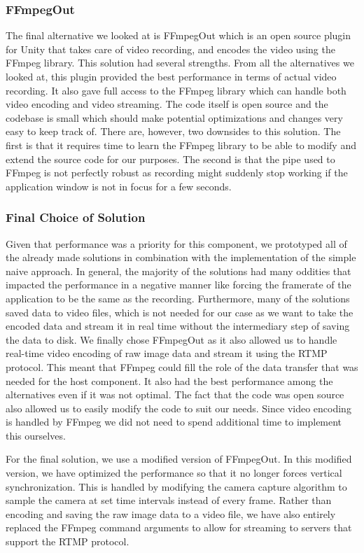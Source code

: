 \subsubsection{FFmpegOut}
The final alternative we looked at is FFmpegOut\cite{ffmpegOut} which is an open source plugin for Unity that takes care of video recording, and encodes the video using the FFmpeg\cite{ffmpeg} library. This solution had several strengths. From all the alternatives we looked at, this plugin provided the best performance in terms of actual video recording. It also gave full access to the FFmpeg library which can handle both video encoding and video streaming. The code itself is open source and the codebase is small which should make potential optimizations and changes very easy to keep track of. There are, however, two downsides to this solution. The first is that it requires time to learn the FFmpeg library to be able to modify and extend the source code for our purposes. The second is that the pipe used to FFmpeg is not perfectly robust as recording might suddenly stop working if the application window is not in focus for a few seconds.  

\subsubsection{Final Choice of Solution}
Given that performance was a priority for this component, we prototyped all of the already made solutions in combination with the implementation of the simple naive approach. In general, the majority of the solutions had many oddities that impacted the performance in a negative manner like forcing the framerate of the application to be the same as the recording. Furthermore, many of the solutions saved data to video files, which is not needed for our case as we want to take the encoded data and stream it in real time without the intermediary step of saving the data to disk. We finally chose FFmpegOut as it also allowed us to handle real-time video encoding of raw image data and stream it using the RTMP protocol. This meant that FFmpeg could fill the role of the data transfer that was needed for the host component. It also had the best performance among the alternatives even if it was not optimal. The fact that the code was open source also allowed us to easily modify the code to suit our needs. Since video encoding is handled by FFmpeg we did not need to spend additional time to implement this ourselves. 

For the final solution, we use a modified version of FFmpegOut. In this modified version, we have optimized the performance so that it no longer forces vertical synchronization. This is handled by modifying the camera capture algorithm to sample the camera at set time intervals instead of every frame. Rather than encoding and saving the raw image data to a video file, we have also entirely replaced the FFmpeg command arguments to allow for streaming to servers that support the RTMP protocol. 

